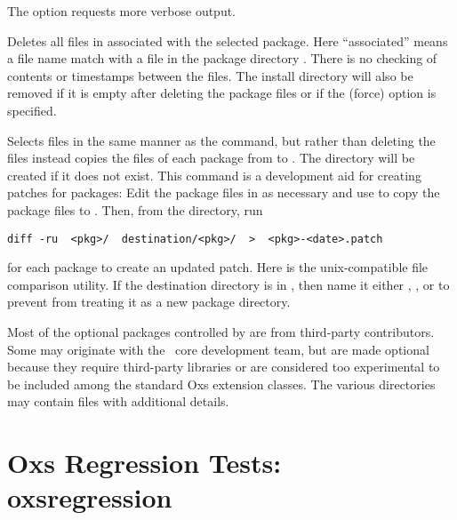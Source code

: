 \begin{description}
  The  option requests more verbose output.
\item[\optkey{uninstall [-f] pkg [pkg \ldots]}]
 Deletes all files in  associated with the
 selected package.  Here ``associated'' means a file name match with a
 file in the package directory .
 There is no checking of contents or timestamps between the files. The
 install directory  will also be
 removed if it is empty after deleting the package files or if the
  (force) option is specified.

\item[\optkey{copyout pkg [pkg \ldots] destination}]
  Selects files in the same manner as the  command, but
  rather than deleting the files instead copies the files of each
  package from  to
  . The directory  will
  be created if it does not exist. This command is a development aid for
  creating patches for packages: Edit the package files in
   as necessary and use  to copy the package files to . Then, from the
   directory, run
\begin{verbatim}
diff -ru  <pkg>/  destination/<pkg>/  >  <pkg>-<date>.patch
\end{verbatim}
  for each package to create an updated patch. Here  is the unix-compatible
  file comparison utility. If the destination directory is in
  , then name it either , , or
   to prevent  from treating it as a new
  package directory.
\end{description}
Most of the optional packages controlled by  are from
third-party contributors.  Some may originate with the \OOMMF\ core
development team, but are made optional because they require third-party
libraries or are considered too experimental to be included among the
standard Oxs extension classes.  The various
 directories may contain
 files with additional details.


\section{Oxs Regression Tests:
            oxsregression\label{sec:oxsregression}}%

